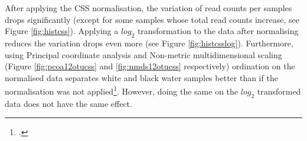 After applying the CSS normalisation, the variation of read counts per samples drops significantly (except for some samples whose total read counts increase, see Figure \ref{fig:histcss}). Applying a $log_2$ transformation to the data after normalising reduces the variation drops even more (see Figure \ref{fig:histcsslog}). Furthermore, using Principal coordinate analysis and Non-metric multidimensional scaling (Figure \ref{fig:pcoa12otucss} and \ref{fig:nmds12otucss} respectively) ordination on the normalised data separates white and black water samples better than if the normalisation was not applied\footcite{These methods are similar to Principal Components Analysis in that they reduce the dimensions of the data. They will be explained in the next Chapter.}. However, doing the same on the $log_2$ transformed data does not have the same effect.

